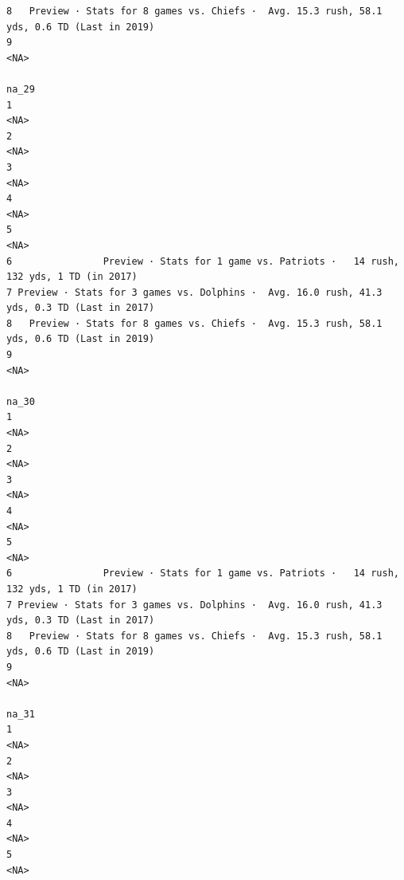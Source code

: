\documentclass[
]{article}
\begin{document}
\begin{verbatim}
8   Preview · Stats for 8 games vs. Chiefs ·  Avg. 15.3 rush, 58.1 yds, 0.6 TD (Last in 2019)
9                                                                                        <NA>
                                                                                        na_29
1                                                                                        <NA>
2                                                                                        <NA>
3                                                                                        <NA>
4                                                                                        <NA>
5                                                                                        <NA>
6                Preview · Stats for 1 game vs. Patriots ·   14 rush, 132 yds, 1 TD (in 2017)
7 Preview · Stats for 3 games vs. Dolphins ·  Avg. 16.0 rush, 41.3 yds, 0.3 TD (Last in 2017)
8   Preview · Stats for 8 games vs. Chiefs ·  Avg. 15.3 rush, 58.1 yds, 0.6 TD (Last in 2019)
9                                                                                        <NA>
                                                                                        na_30
1                                                                                        <NA>
2                                                                                        <NA>
3                                                                                        <NA>
4                                                                                        <NA>
5                                                                                        <NA>
6                Preview · Stats for 1 game vs. Patriots ·   14 rush, 132 yds, 1 TD (in 2017)
7 Preview · Stats for 3 games vs. Dolphins ·  Avg. 16.0 rush, 41.3 yds, 0.3 TD (Last in 2017)
8   Preview · Stats for 8 games vs. Chiefs ·  Avg. 15.3 rush, 58.1 yds, 0.6 TD (Last in 2019)
9                                                                                        <NA>
                                                                                        na_31
1                                                                                        <NA>
2                                                                                        <NA>
3                                                                                        <NA>
4                                                                                        <NA>
5                                                                                        <NA>

\end{verbatim}
\end{document}
